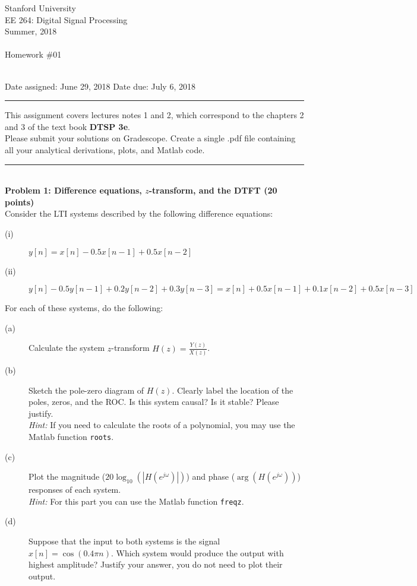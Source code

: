 \documentclass[12pt]{report}
\begin{document}
\thispagestyle{empty}
\begin{centering}
{\large Stanford University}\\
{\large EE 264: Digital Signal Processing}\\
{\large Summer, 2018} \\
\mbox{}\\
{\large Homework \#01}\\
\mbox{}\\
\end{centering}
\noindent Date assigned:  June 29, 2018 \hfill
Date due: July 6, 2018\\
\noindent \rule{6.5 in}{0.5pt}
  This assignment covers lectures notes 1 and 2, which correspond to the chapters 2 and 3 of the text book {\bf DTSP 3e}. \\

  Please submit your solutions on Gradescope. Create a single .pdf file containing all your analytical derivations, plots, and Matlab code. \\
\noindent
\rule{6.5 in}{0.5pt}
\mbox{}\\
\noindent
{\bf Problem 1: Difference equations, $z$-transform, and the DTFT (20 points)} \\
Consider the LTI systems described by the following difference equations:

\begin{description}
	\item[(i)] $y[n] = x[n] - 0.5x[n-1] + 0.5x[n-2]$
	\item[(ii)] $y[n] - 0.5y[n-1] + 0.2y[n-2] + 0.3y[n-3] = x[n] + 0.5x[n-1] + 0.1x[n-2] + 0.5x[n-3]$
\end{description}
\vspace{2.5mm}
\noindent
For each of these systems, do the following:
\begin{description}
	\item[(a)] Calculate the system $z$-transform $H(z) = \frac{Y(z)}{X(z)}$.
	\item[(b)] Sketch the pole-zero diagram of $H(z)$. Clearly label the location of the poles, zeros, and the ROC. Is this system causal? Is it stable? Please justify.\\
	\textit{Hint:} If you need to calculate the roots of a polynomial, you may use the Matlab function \texttt{roots}.
	\item[(c)] Plot the magnitude ($20\log_{10}(|H(e^{j\omega})|)$) and phase ($\arg(H(e^{j\omega}))$) responses of each system. \\
	\textit{Hint:} For this part you can use the Matlab function \texttt{freqz}.
	\item [(d)] Suppose that the input to both systems is the signal $x[n] = \cos(0.4\pi n)$. Which system would produce the output with highest amplitude? Justify your answer, you do not need to plot their output.
\end{description}
\end{document}
